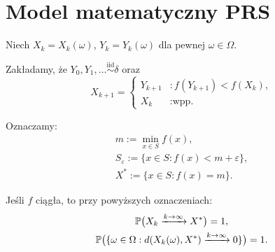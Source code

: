 \documentclass[dvipsnames]{book}
\begin{document}
\section*{Model matematyczny PRS}

Niech $X_k = X_k(\omega)$, $Y_k = Y_k(\omega)$ dla pewnej $\omega \in \Omega$.

Zakładamy, że $Y_0, Y_1, \ldots \overset{\text{iid}}{\sim} \delta$ oraz
\[
  X_{k+1} = \begin{cases}
    Y_{k+1} & : f(Y_{k+1}) < f(X_k), \\
    X_k & : \text{wpp.}
  \end{cases}
\]

Oznaczamy:
\begin{gather*}
  m := \min_{x \in S} f(x), \\
  S_\varepsilon := \{x \in S : f(x) < m + \varepsilon\}, \\
  X^* := \{x \in S : f(x) = m\}.
\end{gather*}

\begin{twierdzenie}
Jeśli $f$ ciągła, to przy powyższych oznaczeniach:
\begin{gather*}
  \P\big(X_k \xrightarrow{k \to \infty} X^*\big) = 1, \\
  \P\big(\{\omega \in \Omega : d(X_k(\omega), X^*) \xrightarrow{k \to \infty} 0\}\big) = 1.
\end{gather*}
\end{twierdzenie}
\end{document}
